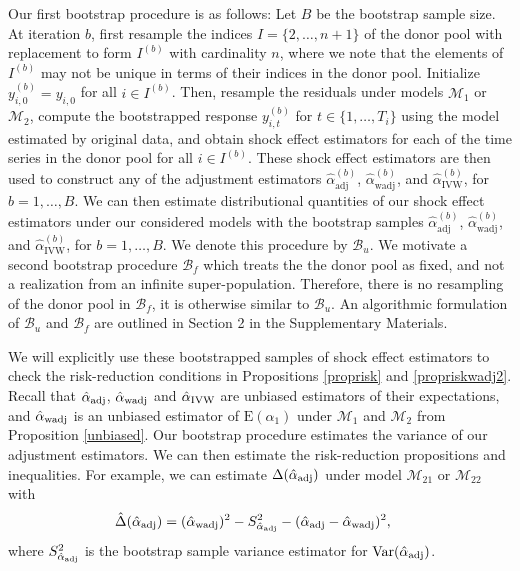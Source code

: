 \documentclass[11pt]{article}
\def\mrm#1{\mathrm{#1}} %
\def\mc#1{\mathcal{#1}} %
\def\E#1{\mathrm{E}(#1)} %
\def\var#1{\mathrm{Var}(#1)} %
\DeclareMathOperator{\Var}{Var} %
\theoremstyle{definition}
\begin{document}
Our first bootstrap procedure is as follows: Let $B$ be the bootstrap sample size. At iteration $b$, first resample the indices $I = \{2, \ldots, n+1\}$ of the donor pool with replacement to form $I^{(b)}$ with cardinality $n$, where we note that the elements of $I^{(b)}$ may not be unique in terms of their  indices in the donor pool. Initialize $y_{i,0}^{(b)}=y_{i,0}$ for all $i \in I^{(b)}$. Then, resample the residuals under models $\mc{M}_1$ or $\mc{M}_{2}$, compute the bootstrapped response  $y_{i,t}^{(b)}$ for   $t \in \{1, \ldots, T_i\}$ using the model estimated by original data,  and obtain shock effect estimators for each of the time series in the donor pool for all $i \in I^{(b)}$. These shock effect estimators are then used to construct any of the adjustment estimators $\hat{\alpha}^{(b)}_{\mrm{adj}}$, $\hat{\alpha}^{(b)}_{\mrm{wadj}}$, and $\hat{\alpha}^{(b)}_{\mrm{IVW}}$, for $b = 1,\ldots,B$. We can then estimate distributional quantities of our shock effect estimators under our considered models with the bootstrap samples $\hat{\alpha}^{(b)}_{\mrm{adj}}$, $\hat{\alpha}^{(b)}_{\mrm{wadj}}$, and $\hat{\alpha}^{(b)}_{\mrm{IVW}}$, for $b = 1,\ldots,B$. We denote this procedure by $\mc{B}_u$. We motivate a second bootstrap procedure $\mc{B}_f$ which treats the the donor pool as fixed, and not a realization from an infinite super-population. Therefore, there is no resampling of the donor pool in $\mc{B}_f$, it is otherwise similar to $\mc{B}_u$. An algorithmic formulation of $\mc{B}_u$ and $\mc{B}_f$  are outlined in Section 2 in the Supplementary Materials.

We will explicitly use these bootstrapped samples of shock effect estimators to check the risk-reduction conditions in Propositions \ref{proprisk} and \ref{propriskwadj2}. Recall that $\hat{\alpha}_{\rm adj}$,  $\hat{\alpha}_{\rm wadj}$ and $\hat{\alpha}_{\rm IVW}$ are unbiased estimators of their expectations, and $\hat{\alpha}_{\rm wadj}$ is an unbiased estimator of $\E{\alpha_1}$ under $\mc{M}_1$ and $\mc{M}_2$ from Proposition \ref{unbiased}. Our bootstrap procedure estimates the variance of our adjustment estimators. We can then estimate the risk-reduction propositions and inequalities. For example, we can estimate $\Delta(\hat{\alpha}_{\rm adj})$ under model $\mc{M}_{21}$ or $\mc{M}_{22}$ with 
\begin{align*}
  \hat{\Delta}(\hat{\alpha}_{\rm adj}) & = (\hat{\alpha}_{\rm wadj})^2 -S^2_{\hat{\alpha}_{\rm adj}} -(\hat{\alpha}_{\rm adj}-\hat{\alpha}_{\rm wadj})^2,
\end{align*}
where $S^2_{\hat{\alpha}_{\rm adj}}$ is the bootstrap sample variance estimator for $\Var(\hat{\alpha}_{\rm adj})$. 
\end{document}

